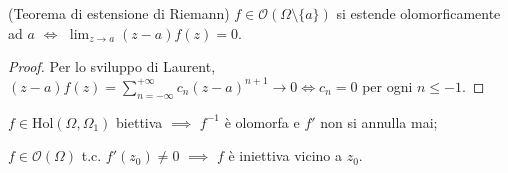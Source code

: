 \begin{cor}
  (Teorema di estensione di Riemann) $f \in \mathcal{O}(\Omega \setminus \{a\})$ si estende olomorficamente ad $a$ $\Leftrightarrow$ $\displaystyle \lim_{z \longrightarrow a} (z-a)f(z)=0$.
\end{cor}

\begin{proof}
  Per lo sviluppo di Laurent, $\displaystyle (z-a)f(z)=\sum_{n=-\infty}^{+\infty} c_n(z-a)^{n+1} \longrightarrow 0 \Leftrightarrow c_n=0$ per ogni $n \le -1$.
\end{proof}

\begin{thm} \label{biolo}
  \begin{nlist}
    \item $f \in \text{Hol}(\Omega, \Omega_1)$ biettiva $\implies$ $f^{-1}$ è olomorfa e $f'$ non si annulla mai;
    \item $f \in \mathcal{O}(\Omega)$ t.c. $f'(z_0) \not=0$ $\implies$ $f$ è iniettiva vicino a $z_0$.
  \end{nlist}
\end{thm}

